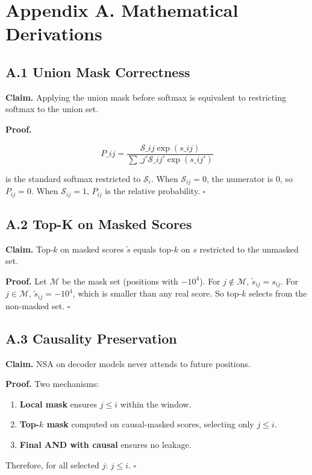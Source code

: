 
\section{Appendix A. Mathematical Derivations}

\subsection{A.1 Union Mask Correctness}

\textbf{Claim.} Applying the union mask before softmax is equivalent to 
restricting softmax to the union set.

\textbf{Proof.} 

\[
P\_{ij} = \frac{\mathcal{S}\_{ij} \exp(s\_{ij})}{\sum\_{j'} \mathcal{S}\_{ij'} \exp(s\_{ij'})}
\tag{A.1}
\]

is the standard softmax restricted to $\mathcal{S}_i$. When $\mathcal{S}_{ij} = 0$, the numerator is 0, so $P_{ij} = 0$. When $\mathcal{S}_{ij} = 1$, $P_{ij}$ is the relative probability. $\square$

\subsection{A.2 Top-K on Masked Scores}

\textbf{Claim.} Top-$k$ on masked scores $\tilde{s}$ equals top-$k$ on $s$ restricted 
to the unmasked set.

\textbf{Proof.} Let $\mathcal{M}$ be the mask set (positions with $-10^4$). For 
$j \notin \mathcal{M}$, $\tilde{s}_{ij} = s_{ij}$. For $j \in \mathcal{M}$, 
$\tilde{s}_{ij} = -10^4$, which is smaller than any real score. So top-$k$ 
selects from the non-masked set. $\square$

\subsection{A.3 Causality Preservation}

\textbf{Claim.} NSA on decoder models never attends to future positions.

\textbf{Proof.} Two mechanisms:

\begin{enumerate}
\item \textbf{Local mask} ensures $j \leq i$ within the window.
\item \textbf{Top-$k$ mask} computed on causal-masked scores, selecting only
  $j \leq i$.
\item \textbf{Final AND with causal} ensures no leakage.

\end{enumerate}
Therefore, for all selected $j$: $j \leq i$. $\square$

